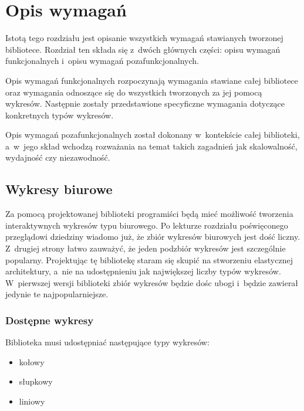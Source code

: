 \chapter{Opis wymagań}
Istotą tego rozdziału jest opisanie wszystkich wymagań stawianych tworzonej bibliotece. 
Rozdział ten składa się z~dwóch głównych części: opisu wymagań funkcjonalnych i~opisu wymagań pozafunkcjonalnych.

Opis wymagań funkcjonalnych rozpoczynają wymagania stawiane całej bibliotece oraz wymagania odnoszące się do wszystkich tworzonych za jej pomocą wykresów. Następnie zostały przedstawione specyficzne wymagania dotyczące konkretnych typów wykresów.

Opis wymagań pozafunkcjonalnych został dokonany w~kontekście całej biblioteki, a~w~jego skład wchodzą rozważania na temat takich zagadnień jak skalowalność, wydajność czy niezawodność.


\section{Wykresy biurowe}
Za pomocą projektowanej biblioteki programiści będą mieć możliwość tworzenia interaktywnych wykresów typu biurowego. Po lekturze rozdziału poświęconego przeglądowi dziedziny wiadomo już, że zbiór wykresów biurowych jest dość liczny. Z~drugiej strony łatwo zauważyć, że jeden podzbiór wykresów jest szczególnie popularny. Projektując tę bibliotekę staram się skupić na stworzeniu elastycznej architektury, a~nie na udostępnieniu jak największej liczby typów wykresów. W~pierwszej wersji biblioteki zbiór wykresów będzie dośc ubogi i~będzie zawierał jedynie te najpopularniejsze.

\subsection{Dostępne wykresy}
Biblioteka musi udostępniać następujące typy wykresów:
\begin{itemize}
\item{kołowy}
\item{słupkowy}
\item{liniowy}
\end{itemize}


